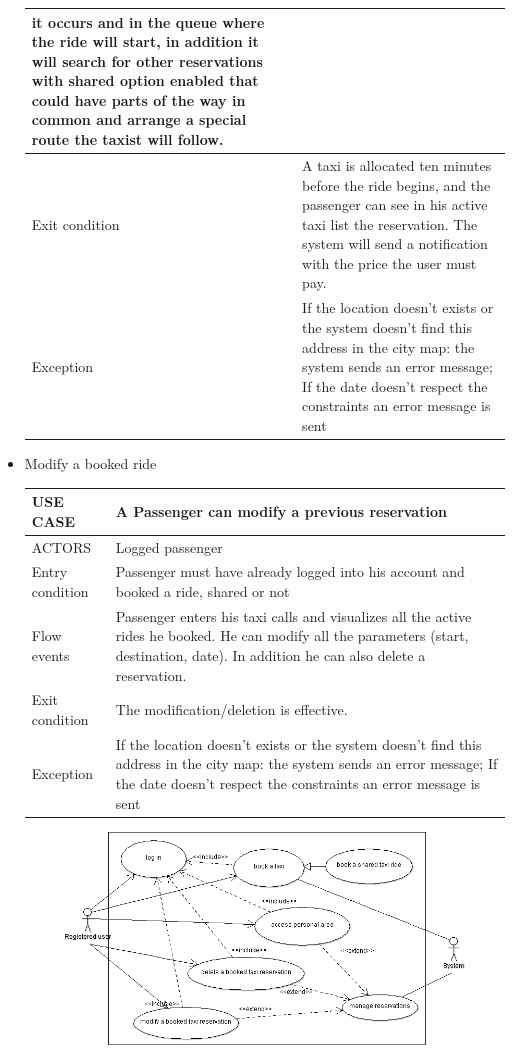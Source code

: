 \begin{itemize}
\begin{center}
\begin{tabular}{ | l | p{11cm} |}
    	 it occurs and in the queue where the ride will start, in addition it will search 
    	 for other reservations with shared option enabled that could have parts of the way 
    	 in common and arrange a special route the taxist will follow.\\ \hline
  	   Exit condition & A taxi is allocated ten minutes before the ride begins, and the 
  	   passenger can see in his active taxi list the reservation.
The system will send a notification with the price the user must pay.\\ \hline
  	   Exception &  If the location doesn’t exists or the system doesn’t find this address in the city map: the system sends an error message;
If the date doesn’t respect the constraints an error message is sent\\ \hline
    \end{tabular}
	\end{center}
\item Modify a booked ride
	\begin{center}
   	 \begin{tabular}{ | l | p{11cm} |}
   	 \hline
   	USE CASE & A Passenger can modify a previous reservation\\ \hline
   	 ACTORS & Logged passenger \\ \hline
    	 Entry condition & Passenger must have already logged into his account and booked a ride, shared or not\\ \hline
    	 Flow events & Passenger enters his taxi calls and visualizes all the active rides he booked. He can modify all the parameters (start, destination, date).
In addition he can also delete a reservation.\\ \hline
  	   Exit condition & The modification/deletion is effective.\\ \hline
  	   Exception &  If the location doesn’t exists or the system doesn’t find this address in the city map: the system sends an error message;
If the date doesn’t respect the constraints an error message is sent\\ \hline
    \end{tabular}
	\end{center}
	
  \begin{figure} [h]
  \centering
  \includegraphics [scale=0.5]{bookataxi.png}
  \end{figure}
	

\end{itemize}
